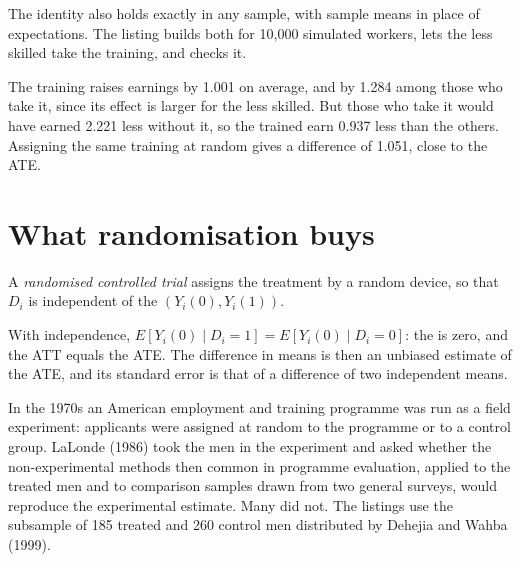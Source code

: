 The identity also holds exactly in any sample, with sample means in place of expectations. The listing builds both
 for 10,000 simulated workers, lets the less skilled take the training, and checks it.

\label{lst:b2:causality-and-experiments:selection}

\label{out:b2:causality-and-experiments:selection}

The training raises earnings by 1.001 on average, and by 1.284 among those who take it, since its effect is larger for the
less skilled. But those who take it would have earned 2.221 less without it, so the trained earn 0.937 less than the
others. Assigning the same training at random gives a difference of 1.051, close to the ATE.

\section{What randomisation buys}\label{sec:b2:causality-and-experiments:rct}

\begin{definition}\label{def:b2:causality-and-experiments:rct}
A \emph{randomised controlled trial} assigns the treatment by a random device, so that
$D_i$ is independent of the  $(Y_i(0), Y_i(1))$.
\end{definition}

With independence, $E[Y_i(0) \mid D_i = 1] = E[Y_i(0) \mid D_i = 0]$: the  is zero, and the ATT equals the
ATE. The difference in means is then an unbiased estimate of the ATE, and its standard error is that of a difference of
two independent means.

\begin{record}
In the 1970s an American employment and training programme was run as a field experiment: applicants were assigned at
random to the programme or to a control group. LaLonde (1986) took the men in the experiment and asked whether the
non-experimental methods then common in programme evaluation, applied to the treated men and to comparison samples drawn
from two general surveys, would reproduce the experimental estimate. Many did not. The listings use the subsample of 185
treated and 260 control men distributed by Dehejia and Wahba (1999).
\end{record}

